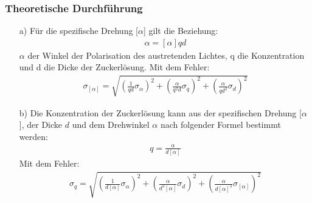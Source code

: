 \documentclass[12pt]{scrartcl}
\begin{document}
\subsubsection{Theoretische Durchführung}
\begin{enumerate}
\item[a)] Für die spezifische Drehung [$\alpha$] gilt die Beziehung:
\begin{align}
\alpha = [\alpha] q d
\end{align}
$\alpha$ der Winkel der Polarisation des austretenden Lichtes, q die Konzentration und d die Dicke der Zuckerlösung.
Mit dem Fehler:
\begin{align}
\sigma_{[\alpha]} = \sqrt{
\left(\frac{1}{q d}\sigma_{\alpha}\right)^2+
\left(\frac{\alpha}{q^2 d}\sigma_q\right)^2+
\left(\frac{\alpha}{q d^2}\sigma_d\right)^2}
\end{align}
\item[b)]
Die Konzentration der Zuckerlösung kann aus der spezifischen Drehung [$\alpha$], der Dicke $d$ und dem Drehwinkel $\alpha$ nach folgender Formel bestimmt werden:
\begin{align}
q = \frac{\alpha}{d [\alpha]}
\label{eqn:a_6}
\end{align}
Mit dem Fehler:
\begin{align}
\sigma_q = \sqrt{
\left(\frac{1}{d [\alpha]}\sigma_\alpha \right)^2+
\left(\frac{\alpha}{d^2 [\alpha]}\sigma_d \right)^2+
\left(\frac{\alpha}{d [\alpha]^2}\sigma_{[\alpha]}\right)^2}
\label{eqn:a_6_sigma}
\end{align}
\end{enumerate}
\end{document}
